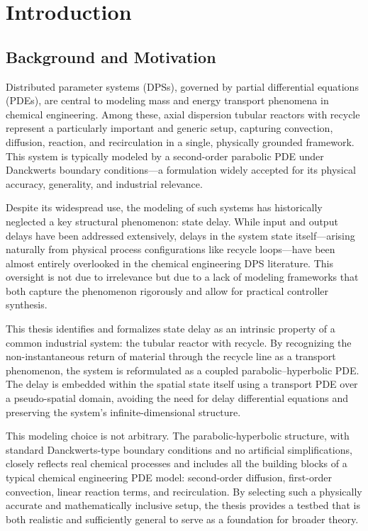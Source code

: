 \chapter{Introduction}\label{ch:0}

\section{Background and Motivation}

Distributed parameter systems (DPSs), governed by partial differential equations (PDEs), are central to modeling mass and energy transport phenomena in chemical engineering. Among these, axial dispersion tubular reactors with recycle represent a particularly important and generic setup, capturing convection, diffusion, reaction, and recirculation in a single, physically grounded framework. This system is typically modeled by a second-order parabolic PDE under Danckwerts boundary conditions—a formulation widely accepted for its physical accuracy, generality, and industrial relevance.

Despite its widespread use, the modeling of such systems has historically neglected a key structural phenomenon: state delay. While input and output delays have been addressed extensively, delays in the system state itself—arising naturally from physical process configurations like recycle loops—have been almost entirely overlooked in the chemical engineering DPS literature. This oversight is not due to irrelevance but due to a lack of modeling frameworks that both capture the phenomenon rigorously and allow for practical controller synthesis.

This thesis identifies and formalizes state delay as an intrinsic property of a common industrial system: the tubular reactor with recycle. By recognizing the non-instantaneous return of material through the recycle line as a transport phenomenon, the system is reformulated as a coupled parabolic–hyperbolic PDE. The delay is embedded within the spatial state itself using a transport PDE over a pseudo-spatial domain, avoiding the need for delay differential equations and preserving the system’s infinite-dimensional structure.

This modeling choice is not arbitrary. The parabolic-hyperbolic structure, with standard Danckwerts-type boundary conditions and no artificial simplifications, closely reflects real chemical processes and includes all the building blocks of a typical chemical engineering PDE model: second-order diffusion, first-order convection, linear reaction terms, and recirculation. By selecting such a physically accurate and mathematically inclusive setup, the thesis provides a testbed that is both realistic and sufficiently general to serve as a foundation for broader theory.

